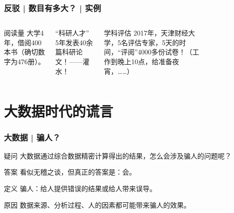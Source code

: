 \begin{frame}
  \frametitle{反驳 | 数目有多大？ | 实例}
  \begin{columns}
  \begin{block}{阅读量}
    大学4年，借阅400本书（确切数字为476册）。
  \end{block}
  \pause
  \pause
  \begin{block}{“科研人才”}
    5年发表40余篇科研论文！——灌水！
  \end{block}
  \pause
  \begin{block}{学科评估}
    2017年，天津财经大学，5名评估专家，5天的时间，“评阅”4000多份试卷！（工作到晚上10点，给准备夜宵，……）
  \end{block}
    \begin{figure}
      \centering
    \end{figure}
  \end{columns}
\end{frame}

\section{大数据时代的谎言}
\begin{frame}
  \frametitle{大数据 | 骗人？}
  \begin{block}{疑问}
    大数据通过综合数据精密计算得出的结果，怎么会涉及骗人的问题呢？
  \end{block}
  \pause
  \begin{block}{答案}
    看似无稽之谈，但真正的答案是：\alert{会}。
  \end{block}
  \pause
  \begin{block}{定义}
    骗人：给人提供错误的结果或给人带来误导。
  \end{block}
  \pause
  \begin{block}{原因}
    数据来源、分析过程、人的因素都可能带来骗人的效果。
  \end{block}
\end{frame}

